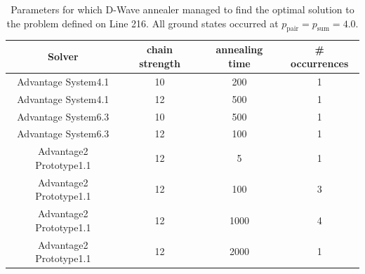\begin{table}
  \small
  \centering
  \begin{tabular}{|c|c|c|c|}
    \hline
    \rowcolor{theader} Solver & chain strength & annealing time & \# occurrences \\
    \hline
    Advantage System4.1       & 10             & 200            & 1              \\
    \hline
    Advantage System4.1       & 12             & 500            & 1              \\
    \hline
    \hline
    Advantage System6.3       & 10             & 500            & 1              \\
    \hline
    Advantage System6.3       & 12             & 100            & 1              \\
    \hline
    \hline
    Advantage2 Prototype1.1   & 12             & 5              & 1              \\
    \hline
    Advantage2 Prototype1.1   & 12             & 100            & 3              \\
    \hline
    Advantage2 Prototype1.1   & 12             & 1000           & 4              \\
    \hline
    Advantage2 Prototype1.1   & 12             & 2000           & 1              \\
    \hline
  \end{tabular}
  \caption{Parameters for which D-Wave annealer managed to find the optimal solution to
    the problem defined on Line 216. All ground states occurred at
    $p_{\text{pair}}=p_{\text{sum}}=4.0$. } \label{tab:line216ground}
\end{table}

